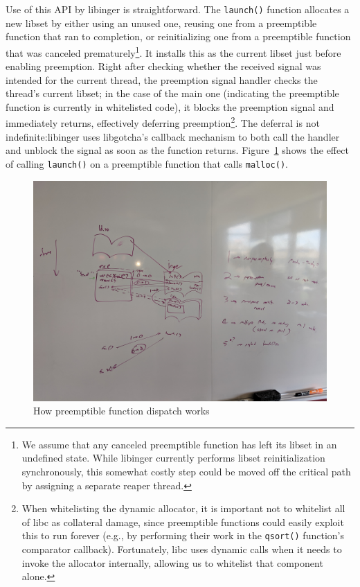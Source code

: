 Use of this API by libinger is straightforward.  The \texttt{launch()} function
allocates a new libset by either using an unused one, reusing one from a preemptible
function that ran to completion, or reinitializing one from a preemptible function
that was canceled prematurely\footnote{We assume that any canceled preemptible
function has left its libset in an undefined state.  While libinger currently
performs libset reinitialization synchronously, this somewhat costly step could be
moved off the critical path by assigning a separate reaper thread.}.  It installs
this as the current libset just before enabling preemption.  Right after checking
whether the received signal was intended for the current thread, the preemption
signal handler checks the thread's current libset; in the case of the main one
(indicating the preemptible function is currently in whitelisted code), it blocks the
preemption signal and immediately returns, effectively deferring
preemption\footnote{When whitelisting the dynamic allocator, it is important not to
whitelist all of libc as collateral damage, since preemptible functions could easily
exploit this to run forever (e.g., by performing their work in the \texttt{qsort()}
function's comparator callback).  Fortunately, libc uses dynamic calls when it needs
to invoke the allocator internally, allowing us to whitelist that component alone.}.
The deferral is not indefinite:\@ libinger uses libgotcha's callback mechanism to
both call the handler and unblock the signal as soon as the function returns.
Figure~\ref{fig:callwhitelist} shows the effect of calling \texttt{launch()} on a
preemptible function that calls \texttt{malloc()}.

\begin{figure}
\includegraphics[width=\columnwidth]{figs/calltree}
\caption{How preemptible function dispatch works}
\label{fig:callwhitelist}
\end{figure}


